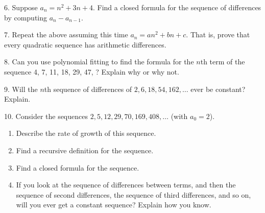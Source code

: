 \documentclass[10pt,]{book}
\theoremstyle{plain}
\theoremstyle{definition}
\theoremstyle{definition}
\theoremstyle{definition}
\theoremstyle{definition}
\numberwithin{equation}{chapter}
\begin{document}
\begin{exerciselist}
\begin{enumerate}[label=(\alph*)]
\end{enumerate}
%
\par\smallskip
\item[6.]\hypertarget{exercise-28}{}\hypertarget{p-276}{}%
Suppose \(a_n = n^2 + 3n + 4\). Find a closed formula for the sequence of differences by computing \(a_n - a_{n-1}\).%
\par\smallskip
\item[7.]\hypertarget{exercise-29}{}\hypertarget{p-278}{}%
Repeat the above assuming this time \(a_n = an^2 + bn + c\). That is, prove that every quadratic sequence has arithmetic differences.%
\par\smallskip
\item[8.]\hypertarget{exercise-30}{}\hypertarget{p-279}{}%
Can you use polynomial fitting to find the formula for the \(n\)th term of the sequence 4, 7, 11, 18, 29, 47, \textellipsis{}? Explain why or why not.%
\par\smallskip
\item[9.]\hypertarget{exercise-31}{}\hypertarget{p-280}{}%
Will the \(n\)th sequence of differences of \(2, 6, 18, 54, 162, \ldots\) ever be constant? Explain.%
\par\smallskip
\item[10.]\hypertarget{exercise-32}{}\hypertarget{p-281}{}%
Consider the sequences \(2, 5, 12, 29, 70, 169, 408,\ldots\) (with \(a_0 = 2\)).%
\par
\hypertarget{p-282}{}%
\leavevmode%
\begin{enumerate}[label=(\alph*)]
\item\hypertarget{li-177}{}\hypertarget{p-283}{}%
Describe the rate of growth of this sequence. %
\item\hypertarget{li-178}{}\hypertarget{p-284}{}%
Find a recursive definition for the sequence. %
\item\hypertarget{li-179}{}\hypertarget{p-285}{}%
Find a closed formula for the sequence. %
\item\hypertarget{li-180}{}\hypertarget{p-286}{}%
If you look at the sequence of differences between terms, and then the sequence of second differences, the sequence of third differences, and so on, will you ever get a constant sequence? Explain how you know. %
\end{enumerate}
%
\par\smallskip
\end{exerciselist}
\typeout{************************************************}
\typeout{************************************************}
\end{document}
